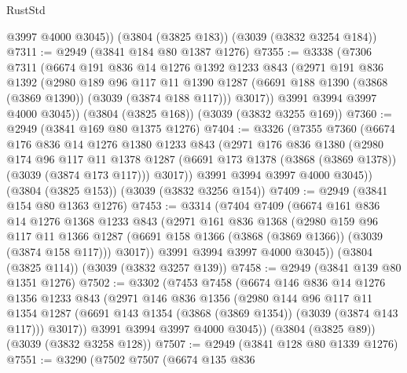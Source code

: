 \begin{lexlean}{RustStd}
\begin{coremodule}
        @3997
        @4000
        @3045))
    (@3804 (@3825 @183))
    (@3039 (@3832 @3254 @184))
@7311 := @2949 (@3841 @184 @80 @1387 @1276)
@7355 := @3338
    (@7306
      @7311
      (@6674
        @191
        @836
        @14
        @1276
        @1392
        @1233
        @843
        (@2971
          @191
          @836
          @1392
          (@2980
            @189
            @96
            @117
            @11
            @1390
            @1287
            (@6691 @188 @1390 (@3868 (@3869 @1390)) (@3039 (@3874 @188 @117)))
            @3017))
        @3991
        @3994
        @3997
        @4000
        @3045))
    (@3804 (@3825 @168))
    (@3039 (@3832 @3255 @169))
@7360 := @2949 (@3841 @169 @80 @1375 @1276)
@7404 := @3326
    (@7355
      @7360
      (@6674
        @176
        @836
        @14
        @1276
        @1380
        @1233
        @843
        (@2971
          @176
          @836
          @1380
          (@2980
            @174
            @96
            @117
            @11
            @1378
            @1287
            (@6691 @173 @1378 (@3868 (@3869 @1378)) (@3039 (@3874 @173 @117)))
            @3017))
        @3991
        @3994
        @3997
        @4000
        @3045))
    (@3804 (@3825 @153))
    (@3039 (@3832 @3256 @154))
@7409 := @2949 (@3841 @154 @80 @1363 @1276)
@7453 := @3314
    (@7404
      @7409
      (@6674
        @161
        @836
        @14
        @1276
        @1368
        @1233
        @843
        (@2971
          @161
          @836
          @1368
          (@2980
            @159
            @96
            @117
            @11
            @1366
            @1287
            (@6691 @158 @1366 (@3868 (@3869 @1366)) (@3039 (@3874 @158 @117)))
            @3017))
        @3991
        @3994
        @3997
        @4000
        @3045))
    (@3804 (@3825 @114))
    (@3039 (@3832 @3257 @139))
@7458 := @2949 (@3841 @139 @80 @1351 @1276)
@7502 := @3302
    (@7453
      @7458
      (@6674
        @146
        @836
        @14
        @1276
        @1356
        @1233
        @843
        (@2971
          @146
          @836
          @1356
          (@2980
            @144
            @96
            @117
            @11
            @1354
            @1287
            (@6691 @143 @1354 (@3868 (@3869 @1354)) (@3039 (@3874 @143 @117)))
            @3017))
        @3991
        @3994
        @3997
        @4000
        @3045))
    (@3804 (@3825 @89))
    (@3039 (@3832 @3258 @128))
@7507 := @2949 (@3841 @128 @80 @1339 @1276)
@7551 := @3290
    (@7502
      @7507
      (@6674
        @135
        @836

\end{coremodule}
\end{lexlean}
